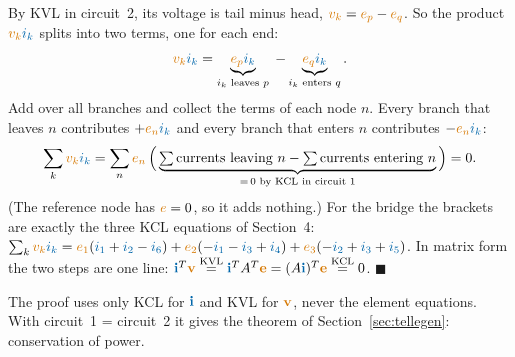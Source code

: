 \documentclass[11pt,a4paper]{article}
\newcommand{\Icol}[1]{\textcolor{ccur}{#1}}
\newcommand{\Vcol}[1]{\textcolor{cvolt}{#1}}
\begin{document}
\begin{center}
\end{center}

By KVL in circuit~2, its voltage is tail minus head, $\Vcol{v_k} = \Vcol{e_p} - \Vcol{e_q}$.
So the product $\Vcol{v_k}\Icol{i_k}$ splits into two terms, one for each end:
\[
  \Vcol{v_k}\Icol{i_k} = \underbrace{\Vcol{e_p}\Icol{i_k}}_{i_k \text{ leaves } p}
                       \; - \underbrace{\Vcol{e_q}\Icol{i_k}}_{i_k \text{ enters } q} .
\]
Add over all branches and collect the terms of each node $n$. Every branch that leaves $n$
contributes $+\Vcol{e_n}\Icol{i_k}$ and every branch that enters $n$ contributes
$-\Vcol{e_n}\Icol{i_k}$:
\[
  \sum_{k} \Vcol{v_k}\Icol{i_k}
  = \sum_{n} \Vcol{e_n}\,\Big(\underbrace{\textstyle\sum \text{currents leaving } n
      - \sum \text{currents entering } n}_{=\,0 \text{ by KCL in circuit 1}}\Big) = 0 .
\]
(The reference node has $\Vcol{e} = 0$, so it adds nothing.) For the bridge the brackets are
exactly the three KCL equations of Section~4:
$\sum_k \Vcol{v_k}\Icol{i_k} = \Vcol{e_1}(\Icol{i_1}+\Icol{i_2}-\Icol{i_6})
+ \Vcol{e_2}(-\Icol{i_1}-\Icol{i_3}+\Icol{i_4}) + \Vcol{e_3}(-\Icol{i_2}+\Icol{i_3}+\Icol{i_5})$.
In matrix form the two steps are one line:
$\Icol{\mathbf{i}}^T\Vcol{\mathbf{v}} \overset{\text{KVL}}{=} \Icol{\mathbf{i}}^T A^T\Vcol{\mathbf{e}}
= (A\Icol{\mathbf{i}})^T\Vcol{\mathbf{e}} \overset{\text{KCL}}{=} 0$. \hfill$\blacksquare$

The proof uses only KCL for $\Icol{\mathbf{i}}$ and KVL for $\Vcol{\mathbf{v}}$, never the
element equations. With circuit~1 = circuit~2 it gives the theorem of
Section~\ref{sec:tellegen}: conservation of power.
\end{document}
